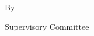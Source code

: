 \newpage

{
\centering
\thesistitle
\tpbreak
By
\tpbreak
\nameanddegrees
\tpbreak
}

\newcommand\panelist[3]{\noindent #1, #2\\\noindent(#3)\tpbreak}
\vfill
\noindent Supervisory Committee
\tpbreak
\panel
\vfill
\pagebreak
